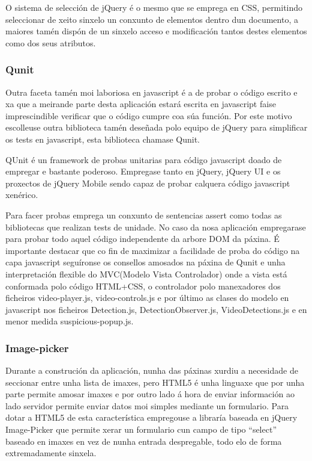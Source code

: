             O sistema de selección de jQuery é o mesmo que se emprega en CSS, permitindo seleccionar de 
            xeito sinxelo un conxunto de elementos dentro dun documento, a maiores tamén dispón de un 
            sinxelo acceso e modificación tantos destes elementos como dos seus atributos.
            
        \subsubsection{Qunit}
        
            Outra faceta tamén moi laboriosa en javascript é a de probar o código escrito e xa que 
            a meirande parte desta aplicación estará escrita en javascript faise imprescindible 
            verificar que o código cumpre coa súa función. Por este motivo escolleuse outra 
            biblioteca tamén deseñada polo equipo de jQuery para simplificar os tests en javascript,
            esta biblioteca chamase Qunit.
            
            QUnit é un framework de probas unitarias para código javascript doado de empregar e bastante
            poderoso. Empregase tanto en jQuery, jQuery UI e os proxectos de jQuery Mobile sendo capaz 
            de probar calquera código javascript xenérico.
            
            Para facer probas emprega un conxunto de sentencias assert como todas as bibliotecas que 
            realizan tests de unidade. No caso da nosa aplicación empregarase para probar todo aquel
            código independente da arbore DOM da páxina. É importante destacar que co fin de maximizar
            a facilidade de proba do código na capa javascript seguíronse os consellos amosados na páxina
            de Qunit\cite{QunitMakeItTesteable} e unha interpretación flexible do MVC(Modelo 
            Vista Controlador) onde a vista está conformada polo código HTML+CSS, o controlador polo 
            manexadores dos ficheiros video-player.js, video-controls.js e por último as clases do 
            modelo en javascript nos ficheiros Detection.js, DetectionObserver.js, VideoDetections.js e 
            en menor medida suspicious-popup.js.
        
        \subsubsection{Image-picker}
            Durante a construción da aplicación, nunha das páxinas xurdiu a necesidade de seccionar
            entre unha lista de imaxes, pero HTML5 é unha linguaxe que por unha parte permite
            amosar imaxes e por outro lado á hora de enviar información ao lado servidor permite 
            enviar datos moi simples mediante un formulario. Para dotar a HTML5 de esta 
            característica empregouse a libraría baseada en jQuery Image-Picker\cite{ImagePickerPage}
            que permite xerar un formulario cun campo de tipo ``select'' 
            baseado en imaxes en vez de nunha entrada despregable, todo elo de forma extremadamente
            sinxela.
        
